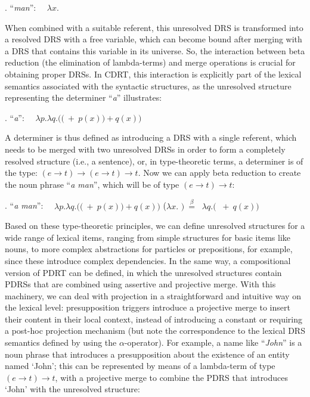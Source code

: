 \ex. ``\textit{man}'':~~ $\lambda x.$

When combined with a suitable referent, this unresolved DRS is transformed
into a resolved DRS with a free variable, which can become bound after
merging with a DRS that contains this variable in its universe. So, the
interaction between beta reduction (the elimination of lambda-terms) and
merge operations is crucial for obtaining proper DRSs. In CDRT, this
interaction is explicitly part of the lexical semantics associated with the
syntactic structures, as the unresolved structure representing the
determiner ``\textit{a}'' illustrates: 

\ex. ``\textit{a}'':~~ 
  $\lambda p.\lambda q.(($$~+~p(x))+q(x))$

A determiner is thus defined as introducing a DRS with a single referent,
which needs to be merged with two unresolved DRSs in order to form
a completely resolved structure (i.e., a sentence), or, in type-theoretic
terms, a determiner is of the type: $(e\rightarrow t)\rightarrow
(e\rightarrow t) \rightarrow t$. Now we can apply beta reduction to create
the noun phrase ``\textit{a man}'', which will be of type $(e\rightarrow t)
\rightarrow t$:

\ex. ``\textit{a man}'':~~ 
  $\lambda p.\lambda q.(($$~+~p(x))+q(x))$ ($\lambda x.$
  $)~\stackrel{\beta}{=}~$ $\lambda q.($
  $~+~q(x))$ 

Based on these type-theoretic principles, we can define unresolved
structures for a wide range of lexical items, ranging from simple structures
for basic items like nouns, to more complex abstractions for particles or
prepositions, for example, since these introduce complex dependencies.  In
the same way, a compositional version of PDRT can be defined, in which the
unresolved structures contain PDRSs that are combined using assertive and
projective merge. With this machinery, we can deal with projection in
a straightforward and intuitive way on the lexical level: presupposition
triggers introduce a projective merge to insert their content in their local
context, instead of introducing a constant
 or requiring
a post-hoc projection mechanism 
(but note the correspondence to the lexical DRS semantics defined by
 using the $\alpha$-operator).  For example,
a name like ``\emph{John}'' is a noun phrase that introduces
a presupposition about the existence of an entity named `John'; this can be
represented by means of a lambda-term of type $(e\rightarrow t)\rightarrow
t$, with a projective merge to combine the PDRS that introduces `John' with
the unresolved structure:

